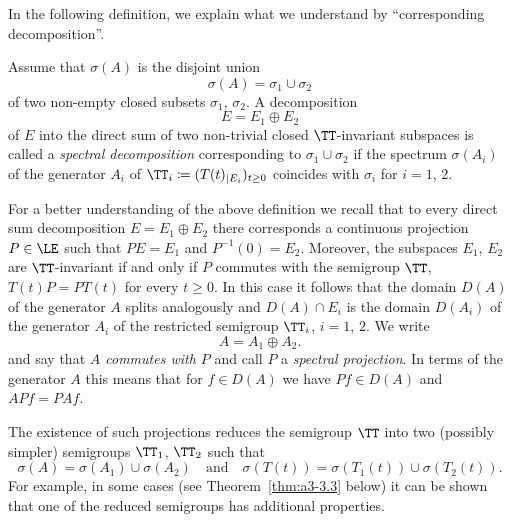 In the following definition, we explain what we understand by \enquote{corresponding decomposition}.

\phantom{x}
\begin{definition}\label{def:a3-3.1}
Assume that $\sigma(A)$ is the disjoint union
\[
\sigma(A) = \sigma_{1} \cup \sigma_{2}
\]
of two non-empty closed subsets $\sigma_{1}$, $\sigma_{2}$.
A decomposition
\[
E = E_{1} \oplus E_{2}
\]
of\/ $E$ into the direct sum of two non-trivial closed $\TT$-invariant subspaces is called a \emph{spectral decomposition} corresponding to $\sigma_{1} \cup \sigma_{2}$ if the spectrum $\sigma(A_{i})$ of the generator $A_{i}$ of\/ $\TT_{i} \coloneqq (T(t)_{|E_{i}})_{t \geq 0}$ coincides with $\sigma_{i}$ for $i = 1$, $2$.
\end{definition}
For a better understanding of the above definition we recall that to every direct sum decomposition $E = E_{1} \oplus E_{2}$ there corresponds a continuous projection $P \in \LE$ such that $PE = E_{1}$ and $P^{-1}(0) = E_{2}$.
Moreover, the subspaces $E_{1}$, $E_{2}$ are $\TT$-invariant if and only if\/ $P$ commutes with the semigroup $\TT$, \ie $T(t)P = PT(t)$ for every $t \geq 0$.
In this case it follows that the domain $D(A)$ of the generator $A$ splits analogously and $D(A) \cap E_{i}$ is the domain $D(A_{i})$ of the generator $A_{i}$ of the restricted semigroup $\TT_{i}$, $i = 1$, $2$.
We write
\[
A = A_{1} \oplus A_{2} .
\]
and say that \emph{$A$ commutes with $P$} and call $P$ a \emph{spectral projection}. 
In terms of the generator $A$ this means that for $f \in D(A)$ we have $Pf \in D(A)$ and $APf = PAf$.

The existence of such projections reduces the semigroup $\TT$ into two (possibly simpler) semigroups $\TT_{1}$, $\TT_{2}$ such that
\[
\sigma(A) = \sigma(A_{1}) \cup \sigma(A_{2}) \quad \text{and} \quad \sigma(T(t)) = \sigma(T_{1}(t)) \cup \sigma(T_{2}(t)) .
\]
For example, in some cases (see Theorem~\ref{thm:a3-3.3} below) it can be shown that one of the reduced semigroups has additional properties.

